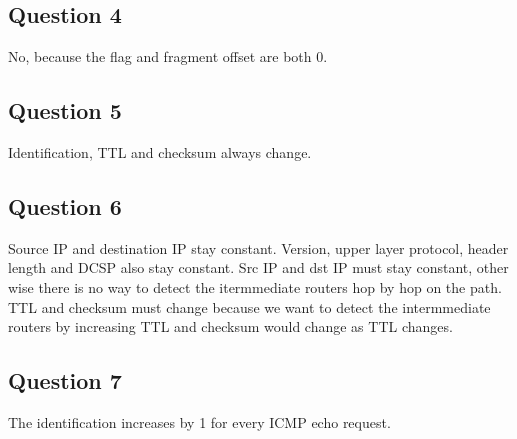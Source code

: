 \documentclass[titlepage, paper=a4, fontsize=11pt]{scrartcl} %
\numberwithin{equation}{section} %
\numberwithin{figure}{section} %
\numberwithin{table}{section} %
\begin{document}
\subsection*{Question 4}
No, because the flag and fragment offset are both 0. \\

\subsection*{Question 5}
Identification, TTL and checksum always change. \\

\subsection*{Question 6}
Source IP and destination IP stay constant. Version, upper layer protocol, header length and DCSP also stay constant. Src IP and dst IP must stay constant, other wise there is no way to detect the itermmediate routers hop by hop on the path. TTL and checksum must change because we want to detect the intermmediate routers by increasing TTL and checksum would change as TTL changes. \\

\subsection*{Question 7}
The identification increases by 1 for every ICMP echo request. \\
\end{document}
